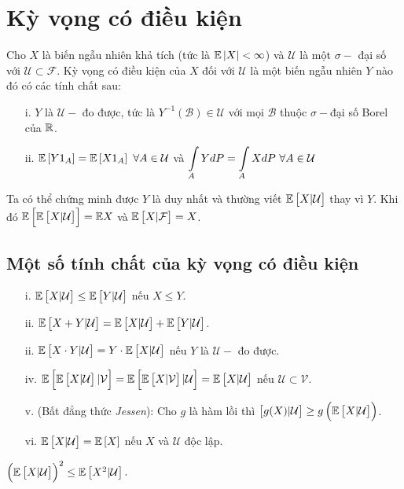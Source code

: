 \section{Kỳ vọng có điều kiện}
\begin{defn}
    Cho $X$ là biến ngẫu nhiên khả tích (tức là $ \mathbb{E} \left| X \right| < \infty$) và $\mathcal{U}$ là một $\sigma-$ đại số với $\mathcal{U} \subset \mathcal{F}$. Kỳ vọng có điều kiện của $X$ đối với $\mathcal{U}$ là một biến ngẫu nhiên $Y$ nào đó có các tính chất sau:
    \begin{itemize}
        \item[i.] $Y$ là $\mathcal{U}-$ đo được, tức là $Y^{-1}(\mathcal{B}) \in \mathcal{U}$ với mọi $\mathcal{B}$ thuộc $\sigma-$đại số Borel của $\mathbb{R}$.
        \item[ii.] $\mathbb{E} \left[ Y 1_A \right] = \mathbb{E} \left[ X 1_A \right] ~ \forall A \in \mathcal{U} $ và
        $\displaystyle\displaystyle \int \limits_A Y dP = \displaystyle \int \limits_A X dP ~ \forall A \in \mathcal{U}$ 
    \end{itemize}
\end{defn}
\begin{remark*}
Ta có thể chứng minh được $Y$ là duy nhất và thường viết $\mathbb{E} \left[ X | \mathcal{U} \right]$ thay vì $Y$. Khi đó $\mathbb{E} \left[ \mathbb{E} \left[ X | \mathcal{U} \right] \right] = \mathbb{E} X$ và $\mathbb{E} \left[ X | \mathcal{F} \right] = X $.     
\end{remark*}
\subsection{Một số tính chất của kỳ vọng có điều kiện}
\begin{itemize}
    \item[i.] $\mathbb{E} \left[ X | \mathcal{U} \right] \leq \mathbb{E} \left[ Y | \mathcal{U} \right] $ nếu $X \leq Y$.
    \item[ii.] $\mathbb{E} \left[ X + Y | \mathcal{U} \right] = \mathbb{E} \left[ X | \mathcal{U} \right] + \mathbb{E} \left[ Y | \mathcal{U} \right]$.
    \item[ii.] $\mathbb{E} \left[ X \cdot Y | \mathcal{U} \right] = Y \cdot \mathbb{E} \left[ X | \mathcal{U} \right] $ nếu $Y$ là $\mathcal{U}-$ đo được.
    \item[iv.] $\mathbb{E} \left[ \mathbb{E} \left[ X | \mathcal{U} \right]| \mathcal{V} \right] = \mathbb{E} \left[ \mathbb{E} \left[ X | \mathcal{V} \right]| \mathcal{U} \right]  = \mathbb{E} \left[ X | \mathcal{U} \right]$ nếu $\mathcal{U} \subset \mathcal{V}$.
    \item[v.] (Bất đẳng thức \textit{Jessen}): Cho $g$ là hàm lồi thì $\left[ g(X) | \mathcal{U} \right] \geq g \left( \mathbb{E} \left[ X | \mathcal{U} \right] \right)$.
    \item[vi.] $\mathbb{E} \left[ X | \mathcal{U} \right] = \mathbb{E} \left[ X  \right]$ nếu $X$ và $\mathcal{U}$ độc lập.
\end{itemize}
\begin{exam*}
    $\left( \mathbb{E} \left[ X | \mathcal{U} \right] \right)^2 \leq \mathbb{E} \left[ X^2 | \mathcal{U} \right].$
\end{exam*}
